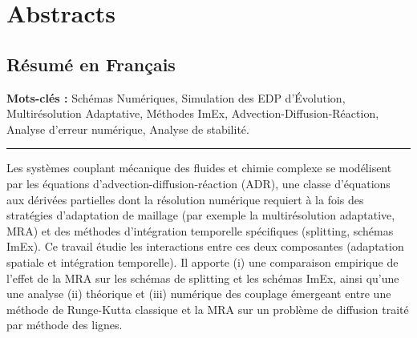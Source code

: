 \section*{Abstracts}
\subsection*{Résumé en Français}
    \textbf{Mots-clés :} Schémas Numériques, Simulation des EDP d'Évolution, Multirésolution Adaptative, Méthodes ImEx, 
    Advection-Diffusion-Réaction, Analyse d'erreur numérique, Analyse de stabilité.\par
    \noindent\rule{\textwidth}{0.4pt}
    Les systèmes couplant mécanique des fluides et chimie complexe se modélisent par les équations d'advection-diffusion-réaction (ADR), 
    une classe d'équations aux dérivées partielles dont la résolution numérique requiert à la fois des stratégies d'adaptation de maillage 
    (par exemple la multirésolution adaptative, MRA) et des méthodes d'intégration temporelle spécifiques (splitting, schémas ImEx).
    Ce travail étudie les interactions entre ces deux composantes (adaptation spatiale et intégration temporelle).
    Il apporte (i) une comparaison empirique de l'effet de la MRA sur les schémas de splitting et les schémas ImEx, 
    ainsi qu'une une analyse (ii) théorique et (iii) numérique des couplage émergeant entre une méthode de Runge-Kutta classique et la MRA sur un problème de diffusion traité par méthode des lignes.
